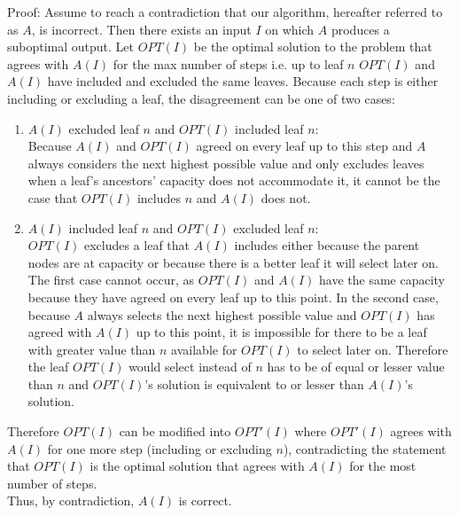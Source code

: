 \documentclass[letterpaper,notitlepage,twoside]{article}
\begin{document}
Proof: Assume to reach a contradiction that our algorithm, hereafter referred to as $A$, is incorrect. Then there exists an input $I$ on which $A$ produces a suboptimal output. Let $OPT(I)$ be the optimal solution to the problem that agrees with $A(I)$ for the max number of steps i.e. up to leaf $n$ $OPT(I)$ and $A(I)$ have included and excluded the same leaves. Because each step is either including or excluding a leaf, the disagreement can be one of two cases:\\
\begin{enumerate}
  \item $A(I)$ excluded leaf $n$ and $OPT(I)$ included leaf $n$:\\
  Because $A(I)$ and $OPT(I)$ agreed on every leaf up to this step and $A$ always considers the next highest possible value and only excludes leaves when a leaf's ancestors' capacity does not accommodate it, it cannot be the case that $OPT(I)$ includes $n$ and $A(I)$ does not. 

  \item $A(I)$ included leaf $n$ and $OPT(I)$ excluded leaf $n$:\\
    $OPT(I)$ excludes a leaf that $A(I)$ includes either because the parent nodes are at capacity or because there is a better leaf it will select later on. The first case cannot occur, as $OPT(I)$ and $A(I)$ have the same capacity because they have agreed on every leaf up to this point. In the second case, because $A$ always selects the next highest possible value and $OPT(I)$ has agreed with $A(I)$ up to this point, it is impossible for there to be a leaf with greater value than $n$ available for $OPT(I)$ to select later on. Therefore the leaf $OPT(I)$ would select instead of $n$ has to be of equal or lesser value than $n$ and $OPT(I)$'s solution is equivalent to or lesser than $A(I)$'s solution.\\
\end{enumerate}
Therefore $OPT(I)$ can be modified into $OPT'(I)$ where $OPT'(I)$ agrees with $A(I)$ for one more step (including or excluding $n$), contradicting the statement that $OPT(I)$ is the optimal solution that agrees with $A(I)$ for the most number of steps.\\
Thus, by contradiction, $A(I)$ is correct.
\end{document}
